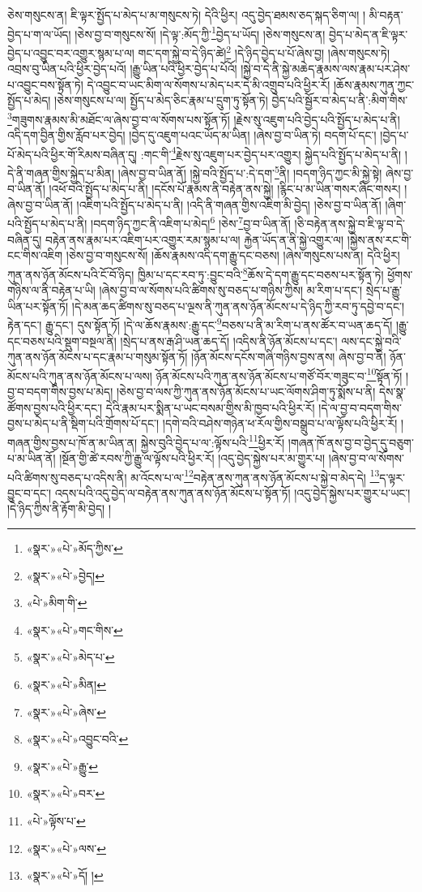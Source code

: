 ཅེས་གསུངས་ན། ཇི་ལྟར་སྤྱོད་པ་མེད་པ་མ་གསུངས་ཏེ། དེའི་ཕྱིར། འདུ་བྱེད་ཐམས་ཅད་སྐད་ཅིག་ལ། །
མི་བརྟན་བྱེད་པ་ག་ལ་ཡོད། །ཅེས་བྱ་བ་གསུངས་སོ། །དེ་ལྟ་:མོད་ཀྱི་\footnote{«སྣར་»«པེ་»མོད་ཀྱིས་}བྱེད་པ་ཡོད། །ཅེས་གསུངས་ན། བྱེད་པ་མེད་ན་ཇི་ལྟར་བྱེད་པ་འབྱུང་བར་འགྱུར་སྙམ་པ་ལ། གང་དག་སྐྱེ་བ་དེ་ཉིད་ཚེ།\footnote{«སྣར་»«པེ་»བྱེད།} །དེ་ཉིད་བྱེད་པ་པོ་ཞེས་བྱ། །ཞེས་གསུངས་ཏེ། འབྲས་བུ་ཡིན་པའི་ཕྱིར་བྱེད་པའོ། །རྒྱུ་ཡིན་པའི་ཕྱིར་བྱེད་པ་པོའོ། །སྐྱེ་བ་དེ་ནི་སྐྱེ་མཆེད་རྣམས་ལས་རྣམ་པར་ཤེས་པ་འབྱུང་བས་སྟོན་ཏེ། དེ་འབྱུང་བ་ཡང་མིག་ལ་སོགས་པ་མེད་པར་དེ་མི་འགྲུབ་པའི་ཕྱིར་རོ། །ཆོས་རྣམས་ཀུན་ཀྱང་སྤྱོད་པ་མེད། །ཅེས་གསུངས་པ་ལ། སྤྱོད་པ་མེད་ཅིང་རྣམ་པ་དྲུག་ཏུ་སྟོན་ཏེ། བྱེད་པའི་སྦྱོར་བ་མེད་པ་ནི་:མིག་གིས་\footnote{«པེ་»མིག་གི་}གཟུགས་རྣམས་མི་མཐོང་ལ་ཞེས་བྱ་བ་ལ་སོགས་པས་སྟོན་ཏོ། །རྗེས་སུ་འཇུག་པའི་བྱེད་པའི་སྤྱོད་པ་མེད་པ་ནི། འདི་དག་བྱིན་གྱིས་རློབ་པར་བྱེད། །བྱེད་དུ་འཇུག་པའང་ཡོད་མ་ཡིན། །ཞེས་བྱ་བ་ཡིན་ཏེ། བདག་པོ་དང་། །བྱེད་པ་པོ་མེད་པའི་ཕྱིར་གོ་རིམས་བཞིན་དུ། :གང་གི་\footnote{«སྣར་»«པེ་»གང་གིས་}རྗེས་སུ་འཇུག་པར་བྱེད་པར་འགྱུར། སྐྱེད་པའི་སྤྱོད་པ་མེད་པ་ནི། །དེ་ནི་གཞན་གྱིས་སྐྱེད་པ་མིན། །ཞེས་བྱ་བ་ཡིན་ནོ། །སྐྱེ་བའི་སྤྱོད་པ་:དེ་དག་\footnote{«སྣར་»«པེ་»མེད་པ་}ནི། །བདག་ཉིད་ཀྱང་མི་སྐྱེ་སྟེ། ཞེས་བྱ་བ་ཡིན་ནོ། །འཕོ་བའི་སྤྱོད་པ་མེད་པ་ནི། །དངོས་པོ་རྣམས་ནི་བརྟེན་ནས་སྐྱེ། །རྙིང་པ་མ་ཡིན་གསར་ཞིང་གསར། །ཞེས་བྱ་བ་ཡིན་ནོ། །འཇིག་པའི་སྤྱོད་པ་མེད་པ་ནི། །འདི་ནི་གཞན་གྱིས་འཇིག་མི་བྱེད། །ཅེས་བྱ་བ་ཡིན་ནོ། །ཞིག་པའི་སྤྱོད་པ་མེད་པ་ནི། །བདག་ཉིད་ཀྱང་ནི་འཇིག་པ་མེད།\footnote{«སྣར་»«པེ་»མིན།} །ཅེས་\footnote{«སྣར་»«པེ་»ཞེས་}བྱ་བ་ཡིན་ནོ། །ཅི་བརྟེན་ནས་སྐྱེ་བ་ཇི་ལྟ་བ་དེ་བཞིན་དུ། བརྟེན་ནས་རྣམ་པར་འཇིག་པར་འགྱུར་རམ་སྙམ་པ་ལ། རྐྱེན་ཡོད་ན་ནི་སྐྱེ་འགྱུར་ལ། །སྐྱེས་ནས་རང་གི་ངང་གིས་འཇིག །ཅེས་བྱ་བ་གསུངས་སོ། །ཆོས་རྣམས་འདི་དག་རྒྱུ་དང་བཅས། །ཞེས་གསུངས་པས་ན། དེའི་ཕྱིར། ཀུན་ནས་ཉོན་མོངས་པའི་ངོ་བོ་ཉིད། ཁྱིམ་པ་དང་རབ་ཏུ་:བྱུང་བའི་\footnote{«སྣར་»«པེ་»འབྱུང་བའི་}ཆོས་དེ་དག་རྒྱུ་དང་བཅས་པར་སྟོན་ཏེ། ཕྱོགས་གཉིས་ལ་ནི་བརྟེན་པ་ཡི། །ཞེས་བྱ་བ་ལ་སོགས་པའི་ཚིགས་སུ་བཅད་པ་གཉིས་ཀྱིས། མ་རིག་པ་དང་། སྲེད་པ་རྒྱུ་ཡིན་པར་སྟོན་ཏོ། །དེ་མན་ཆད་ཚིགས་སུ་བཅད་པ་ལྔས་ནི་ཀུན་ནས་ཉོན་མོངས་པ་དེ་ཉིད་ཀྱི་རབ་ཏུ་དབྱེ་བ་དང་། རྟེན་དང་། རྒྱུ་དང་། དུས་སྟོན་ཏོ། །དེ་ལ་ཆོས་རྣམས་:རྒྱུ་དང་\footnote{«སྣར་»«པེ་»རྒྱུ་}བཅས་པ་ནི་མ་རིག་པ་ནས་ཚོར་བ་ཡན་ཆད་དོ། །རྒྱུ་དང་བཅས་པའི་སྡུག་བསྔལ་ནི། །སྲེད་པ་ནས་རྒ་ཤི་ཡན་ཆད་དོ། །འདིས་ནི་ཉོན་མོངས་པ་དང་། ལས་དང་སྐྱེ་བའི་ཀུན་ནས་ཉོན་མོངས་པ་དང་རྣམ་པ་གསུམ་སྟོན་ཏོ། །ཉོན་མོངས་དངོས་གཞི་གཉིས་བྱས་ནས། ཞེས་བྱ་བ་ནི། ཉོན་མོངས་པའི་ཀུན་ནས་ཉོན་མོངས་པ་ལས། ཉོན་མོངས་པའི་ཀུན་ནས་ཉོན་མོངས་པ་གཙོ་བོར་གཟུང་བ་\footnote{«སྣར་»«པེ་»བར་}སྟོན་ཏོ། །བྱ་བ་བདག་གིས་བྱས་པ་མེད། །ཅེས་བྱ་བ་ལས་ཀྱི་ཀུན་ནས་ཉོན་མོངས་པ་ཡང་ལོགས་ཤིག་ཏུ་སྨོས་པ་ནི། དེས་སྣ་ཚོགས་བྱས་པའི་ཕྱིར་དང་། དེའི་རྣམ་པར་སྨིན་པ་ཡང་བསམ་གྱིས་མི་ཁྱབ་པའི་ཕྱིར་རོ། །དེ་ལ་བྱ་བ་བདག་གིས་བྱས་པ་མེད་པ་ནི་སྡིག་པའི་གྲོགས་པོ་དང་། །དགེ་བའི་བཤེས་གཉེན་ཕ་རོལ་གྱིས་བསྒྲུབ་པ་ལ་ལྟོས་པའི་ཕྱིར་རོ། །གཞན་གྱིས་བྱས་པ་ཁོ་ན་མ་ཡིན་ན། སྐྱེས་བུའི་བྱེད་པ་ལ་:ལྟོས་པའི་\footnote{«པེ་»ལྟོས་པ་}ཕྱིར་རོ། །གཞན་ཁོ་ནས་བྱ་བ་བྱེད་དུ་བཅུག་པ་མ་ཡིན་ནོ། །སྔོན་གྱི་ཚེ་རབས་ཀྱི་རྒྱུ་ལ་ལྟོས་པའི་ཕྱིར་རོ། །འདུ་བྱེད་སྐྱེས་པར་མ་གྱུར་པ། །ཞེས་བྱ་བ་ལ་སོགས་པའི་ཚིགས་སུ་བཅད་པ་འདིས་ནི། མ་འོངས་པ་ལ་\footnote{«སྣར་»«པེ་»ལས་}བརྟེན་ནས་ཀུན་ནས་ཉོན་མོངས་པ་སྐྱེ་བ་མེད་དེ། \footnote{«སྣར་»«པེ་»དོ། ། }ད་ལྟར་བྱུང་བ་དང་། འདས་པའི་འདུ་བྱེད་ལ་བརྟེན་ནས་ཀུན་ནས་ཉོན་མོངས་པ་སྟོན་ཏོ། །འདུ་བྱེད་སྐྱེས་པར་གྱུར་པ་ཡང་། །དེ་ཉིད་ཀྱིས་ནི་རྟོག་མི་བྱེད། །
